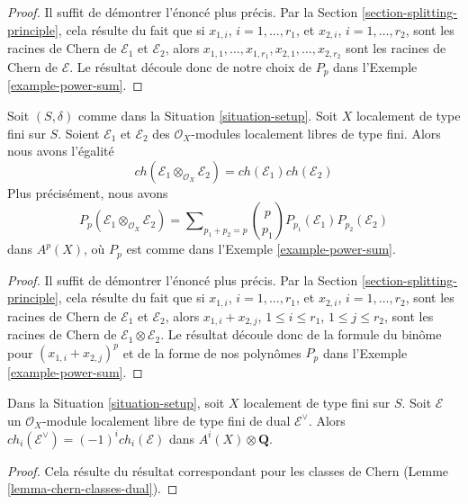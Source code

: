 \begin{proof}
Il suffit de démontrer l'énoncé plus précis. Par la
Section \ref{section-splitting-principle},
cela résulte du fait que si $x_{1, i}$, $i = 1, \ldots, r_1$,
et $x_{2, i}$, $i = 1, \ldots, r_2$, sont les
racines de Chern de $\mathcal{E}_1$ et $\mathcal{E}_2$, alors
$x_{1, 1}, \ldots, x_{1, r_1}, x_{2, 1}, \ldots, x_{2, r_2}$
sont les racines de Chern de $\mathcal{E}$. Le résultat découle donc
de notre choix de $P_p$ dans l'Exemple \ref{example-power-sum}.
\end{proof}

\begin{lemma}
\label{lemma-chern-character-multiplicative}
Soit $(S, \delta)$ comme dans la Situation \ref{situation-setup}. Soit $X$ localement
de type fini sur $S$. Soient $\mathcal{E}_1$ et $\mathcal{E}_2$
des $\mathcal{O}_X$-modules localement libres de type fini.
Alors nous avons l'égalité
$$
ch(\mathcal{E}_1 \otimes_{\mathcal{O}_X} \mathcal{E}_2) =
ch(\mathcal{E}_1) ch(\mathcal{E}_2)
$$
Plus précisément, nous avons
$$
P_p(\mathcal{E}_1 \otimes_{\mathcal{O}_X} \mathcal{E}_2) =
\sum\nolimits_{p_1 + p_2 = p}
{p \choose p_1} P_{p_1}(\mathcal{E}_1) P_{p_2}(\mathcal{E}_2)
$$
dans $A^p(X)$, où $P_p$ est comme dans l'Exemple \ref{example-power-sum}.
\end{lemma}

\begin{proof}
Il suffit de démontrer l'énoncé plus précis. Par la
Section \ref{section-splitting-principle},
cela résulte du fait que si $x_{1, i}$, $i = 1, \ldots, r_1$,
et $x_{2, i}$, $i = 1, \ldots, r_2$, sont les
racines de Chern de $\mathcal{E}_1$ et $\mathcal{E}_2$, alors
$x_{1, i} + x_{2, j}$, $1 \leq i \leq r_1$, $1 \leq j \leq r_2$,
sont les racines de Chern de $\mathcal{E}_1 \otimes \mathcal{E}_2$.
Le résultat découle donc de la formule du binôme pour
$(x_{1, i} + x_{2, j})^p$ et de la
forme de nos polynômes $P_p$ dans l'Exemple \ref{example-power-sum}.
\end{proof}

\begin{lemma}
\label{lemma-chern-character-dual}
Dans la Situation \ref{situation-setup}, soit $X$ localement de type fini sur $S$.
Soit $\mathcal{E}$ un $\mathcal{O}_X$-module localement libre de type fini
de dual $\mathcal{E}^\vee$. Alors
$ch_i(\mathcal{E}^\vee) = (-1)^i ch_i(\mathcal{E})$ dans
$A^i(X) \otimes \mathbf{Q}$.
\end{lemma}

\begin{proof}
Cela résulte du résultat correspondant pour les classes de Chern
(Lemme \ref{lemma-chern-classes-dual}).
\end{proof}












